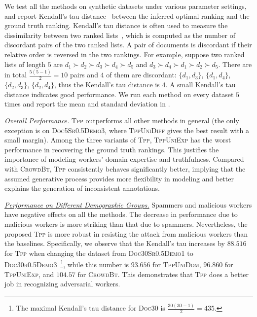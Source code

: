 We test all the methods on synthetic datasets under various parameter settings,
and report Kendall's tau distance~\cite{kendall1938new}  between the inferred
optimal ranking and the ground truth ranking.  Kendall's tau distance is often
used to measure the dissimilarity between two ranked
lists~\cite{klementiev2008unsupervised}, which is computed as the number of
discordant pairs of the two ranked lists. A pair of documents is discordant if
their relative order is reversed in the two rankings.  For example, suppose two
ranked lists of length $5$ are $d_1 \succ d_2 \succ d_3 \succ d_4 \succ d_5$ and
$d_3\succ d_4 \succ d_1 \succ d_2 \succ d_5$. There are in total
$\frac{5(5-1)}{2}=10$ pairs and $4$ of them are discordant: $\{d_1, d_3\}$,
$\{d_1, d_4\}$, $\{d_2, d_3\}$, $\{d_2, d_4\}$,  thus the Kendall's tau distance
is $4$.  A small Kendall's tau distance indicates good performance. We run each
method on every dataset $5$ times and report the mean and standard deviation in
.

\noindent\underline{\emph{Overall Performance.}} \textsc{Tpp} outperforms all
other methods in general (the only exception is on \textsc{Doc5Sr0.5Demo3},
where \textsc{TppUniDiff} gives the best result with a small margin).  Among the
three variants of \textsc{Tpp}, \textsc{TppUniExp} has the worst performance in
recovering the ground truth rankings. This justifies the importance of modeling
workers' domain expertise and truthfulness. Compared with \textsc{CrowdBt},
\textsc{Tpp} consistently behaves significantly better, implying that the
assumed generative process provides more flexibility in modeling and better
explains the generation of inconsistent annotations.

\noindent\underline{\emph{Performance on Different Demographic Groups.}}
Spammers and malicious workers have negative effects on all the methods. The
decrease in performance due to malicious workers is  more striking than that due
to spammers.  Nevertheless, the proposed \textsc{Tpp} is more robust in
resisting the attack from malicious workers than the baselines.  Specifically,
we observe that the Kendall's tau increases by $88.516$ for \textsc{Tpp} when
changing the dataset from \textsc{Doc30Sr0.5Demo1} to
\textsc{Doc30r0.5Demo3}~\footnote{The maximal Kendall's tau distance for
\textsc{Doc30} is $\frac{30(30-1)}{2} = 435$.}, while this number is $93.656$
for \textsc{TppUniDom}, $96.860$ for \textsc{TppUniExp}, and $104.57$ for
\textsc{CrowdBt}. This demonstrates that \textsc{Tpp} does a better job in
recognizing adversarial workers.

